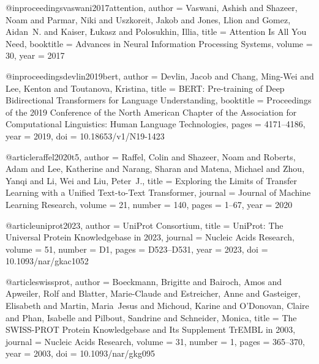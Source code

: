 \documentclass{article}
\begin{document}

@inproceedings{vaswani2017attention,
  author    = {Vaswani, Ashish and Shazeer, Noam and Parmar, Niki and
               Uszkoreit, Jakob and Jones, Llion and Gomez, Aidan~N. and
               Kaiser, {\L}ukasz and Polosukhin, Illia},
  title     = {Attention Is All You Need},
  booktitle = {Advances in Neural Information Processing Systems},
  volume    = {30},
  year      = {2017}
}

@inproceedings{devlin2019bert,
  author    = {Devlin, Jacob and Chang, Ming-Wei and Lee, Kenton and
               Toutanova, Kristina},
  title     = {{BERT}: Pre-training of Deep Bidirectional Transformers
               for Language Understanding},
  booktitle = {Proceedings of the 2019 Conference of the North {A}merican
               Chapter of the Association for Computational Linguistics:
               Human Language Technologies},
  pages     = {4171--4186},
  year      = {2019},
  doi       = {10.18653/v1/N19-1423}
}

@article{raffel2020t5,
  author    = {Raffel, Colin and Shazeer, Noam and Roberts, Adam and
               Lee, Katherine and Narang, Sharan and Matena, Michael and
               Zhou, Yanqi and Li, Wei and Liu, Peter~J.},
  title     = {Exploring the Limits of Transfer Learning with a Unified
               Text-to-Text Transformer},
  journal   = {Journal of Machine Learning Research},
  volume    = {21},
  number    = {140},
  pages     = {1--67},
  year      = {2020}
}


@article{uniprot2023,
  author    = {{UniProt Consortium}},
  title     = {{UniProt}: The Universal Protein Knowledgebase in 2023},
  journal   = {Nucleic Acids Research},
  volume    = {51},
  number    = {D1},
  pages     = {D523--D531},
  year      = {2023},
  doi       = {10.1093/nar/gkac1052}
}

@article{swissprot,
  author    = {Boeckmann, Brigitte and Bairoch, Amos and Apweiler, Rolf and
               Blatter, Marie-Claude and Estreicher, Anne and Gasteiger, Elisabeth and
               Martin, Maria~Jesus and Michoud, Karine and O'Donovan, Claire and
               Phan, Isabelle and Pilbout, Sandrine and Schneider, Monica},
  title     = {The {SWISS-PROT} Protein Knowledgebase and Its Supplement
               {TrEMBL} in 2003},
  journal   = {Nucleic Acids Research},
  volume    = {31},
  number    = {1},
  pages     = {365--370},
  year      = {2003},
  doi       = {10.1093/nar/gkg095}
}
\end{document}
